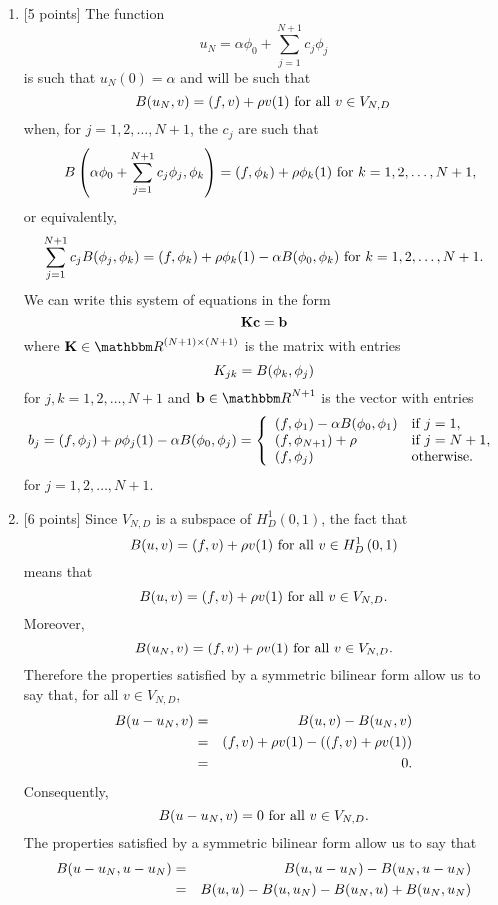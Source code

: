 \begin{solution}
\begin{enumerate}
\item {[5 points]} The function
\[
u_N=\alpha\phi_0+\sum_{j=1}^{N+1}c_j\phi_j
\]
is such that $u_N(0)=\alpha$ and will be such that
\[
B(u_N,v)=(f,v)+\rho v(1)\mbox{ for all }v\in V_{N,D}
\]
when, for $j=1,2,\ldots,N+1$, the $c_j$ are such that
\begin{eqnarray*}
&&B\left(\alpha\phi_0+\sum_{j=1}^{N+1}c_j\phi_j,\phi_k\right)=(f,\phi_k)+\rho \phi_k(1)\mbox{ for }k=1,2,\ldots,N+1,
\end{eqnarray*}
or equivalently,
\[
\sum_{j=1}^{N+1}c_jB(\phi_j,\phi_k)=(f,\phi_k)+\rho \phi_k(1)-\alpha B(\phi_0,\phi_k)\mbox{ for }k=1,2,\ldots,N+1.
\]
We can write this system of equations in the form
\[
{\bf K}{\bf c}={\bf b}
\]
where $\BK\in\R^{\left(N+1\right)\times\left(N+1\right)}$ is the matrix with entries
\[
K_{jk}=B(\phi_k,\phi_j)
\]
for $j,k=1,2,\ldots,N+1$ and $\Bb\in\R^{N+1}$ is the vector with entries
\[
b_j=(f,\phi_j)+\rho \phi_j(1)-\alpha B(\phi_0,\phi_j)=\left\{\begin{array}{ll}
(f,\phi_1)-\alpha B(\phi_0,\phi_1) & \mbox{if }j=1,
\\
(f,\phi_{N+1})+\rho & \mbox{if }j=N+1,
\\
(f,\phi_j) & \mbox{otherwise.}
\end{array}\right.
\]
for $j=1,2,\ldots,N+1$.
\\
\item {[6 points]} Since $V_{N,D}$ is a subspace of $H^1_D\left(0,1\right)$, the fact that
\[
B(u,v)=(f,v)+\rho v(1)\mbox{ for all }v\in H^1_D\left(0,1\right)
\]
means that
\[
B(u,v)=(f,v)+\rho v(1)\mbox{ for all }v\in V_{N,D}.
\]
Moreover,
\[
B(u_N,v)=(f,v)+\rho v(1)\mbox{ for all }v\in V_{N,D}.
\]
Therefore the properties satisfied by a symmetric bilinear form allow us to say that, for all $v\in V_{N,D}$,
\begin{eqnarray*}
B(u-u_N,v)&=&B(u,v)-B(u_N,v)
\\
&=&(f,v)+\rho v(1)-\left((f,v)+\rho v(1)\right)
\\
&=&0.
\end{eqnarray*}
Consequently,
\[
B(u-u_N,v)=0\mbox{ for all }v\in V_{N,D}.
\]
The properties satisfied by a symmetric bilinear form allow us to say that
\begin{eqnarray*}
B\ip{u-u_N,u-u_N}&=&B\ip{u,u-u_N}-B\ip{u_N,u-u_N}
\\
&=&B\ip{u,u}-B\ip{u,u_N}-B\ip{u_N,u}+B\ip{u_N,u_N}

\end{eqnarray*}
\end{enumerate}
\end{solution}
